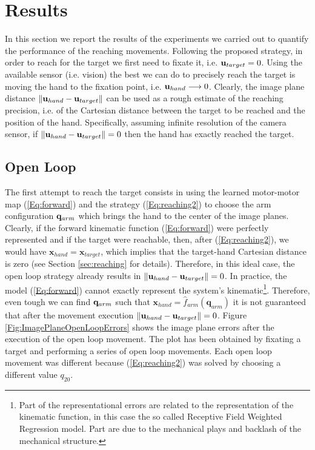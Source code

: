 \section{Results}
\label{sec:results}

In this section we report the results of the experiments we carried out
to quantify the performance of the reaching movements. Following the proposed strategy, 
in order to reach for the 
target we first need to fixate it, i.e. $\mathbf{u}_{target} = 0$. Using the available sensor (i.e. vision) the best we can do to precisely reach the target is moving the hand to the fixation point, i.e. $
{\mathbf{u}_{hand}} \longrightarrow 0$. Clearly, the image plane distance $\| \mathbf{u}_{hand} - \mathbf{u}_{target} \|$ can be used as a rough estimate of the reaching precision, i.e. of the Cartesian distance between the target to be reached and the position of the hand. Specifically, assuming infinite resolution of the camera sensor, if $\| \mathbf{u}_{hand} - \mathbf{u}_{target}\| = 0$ then the hand has exactly reached the target.

\subsection{Open Loop}
The first attempt to reach the target consists in using the learned motor-motor map 
(\ref{Eq:forward}) and the strategy (\ref{Eq:reaching2})
to choose the arm configuration $\mathbf q_{arm}$ which brings the hand to the center 
of the image planes. Clearly, if the forward 
kinematic function (\ref{Eq:forward}) were perfectly represented and if the target were reachable, then, after (\ref{Eq:reaching2}), we would have 
$\mathbf x_{hand} =  \mathbf x_{target}$, which implies that the target-hand Cartesian distance 
 is zero (see Section \ref{sec:reaching} for details). Therefore, in this ideal case, the open loop 
 strategy already results in $\| \mathbf{u}_{hand} - \mathbf{u}_{target} \| = 0$. In practice, the model 
 (\ref{Eq:forward}) cannot exactly represent the system's kinematic\footnote{Part of the representational 
 errors are related to the representation of the kinematic function, in this case the
 so called Receptive Field Weighted Regression model. Part are due to the mechanical plays and backlash of the
 mechanical structure.}. Therefore, even tough we can find $\mathbf q_{arm}$ such that $\mathbf x_{hand}=
 \hat f_{arm}(\mathbf q_{arm})$ it is not guaranteed that after the movement execution 
 $\| \mathbf{u}_{hand} - \mathbf{u}_{target} \| = 0$. Figure \ref{Fig:ImagePlaneOpenLoopErrors}
 shows the image plane errors after the execution of the open loop movement. The plot has been obtained
 by fixating a target and performing a series of open loop movements. Each open loop
 movement was different because (\ref{Eq:reaching2}) was solved 
 by choosing a different value $q_{20}$. 


